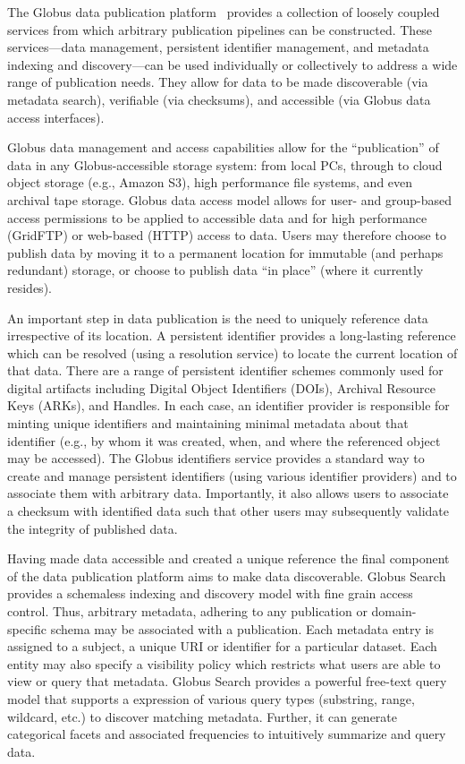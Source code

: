 \documentclass{aip-cp}
\begin{document}
The Globus data publication platform~\cite{chard2015globus} provides a
collection of loosely coupled services from which arbitrary publication
pipelines can be constructed.  These services---data management, persistent
identifier management, and  metadata indexing and discovery---can be used
individually or collectively to address a wide range of publication needs.
They allow for data to be made discoverable (via metadata search), verifiable
(via checksums), and accessible (via Globus data access interfaces).

Globus data management and access capabilities allow for the  ``publication''
of data in any Globus-accessible storage system:  from local PCs, through to
cloud object storage (e.g., Amazon S3), high performance file systems, and
even archival tape storage. Globus data access model allows for user- and
group-based access permissions to be applied to accessible data and for high
performance (GridFTP) or web-based (HTTP) access to data.  Users may therefore
choose to publish data by moving it to a permanent location for  immutable
(and perhaps redundant) storage, or choose to publish  data ``in place''
(where it currently resides).

An important step in data publication is the need to uniquely reference data
irrespective of its location. A persistent identifier provides a long-lasting
reference which can be  resolved (using a resolution service) to locate the
current location of that data. There are a range of persistent identifier
schemes commonly used for digital artifacts including Digital Object
Identifiers (DOIs), Archival Resource Keys (ARKs), and Handles.  In each case,
an identifier provider is responsible for minting unique identifiers and
maintaining minimal metadata about that  identifier (e.g., by whom it was
created, when, and where  the referenced object may be accessed). The Globus
identifiers service provides a standard way to create and manage persistent
identifiers (using various identifier providers) and to associate them with
arbitrary data. Importantly, it also allows users to associate a checksum with
identified data such that other users may subsequently validate the integrity
of published data.

Having made data accessible and created a unique reference the final component
of the data publication platform aims to make data discoverable. Globus Search
provides a schemaless indexing and discovery model with fine grain access
control.  Thus, arbitrary metadata, adhering to any publication or domain-
specific schema may be associated with a publication.  Each metadata entry is
assigned to a subject, a unique  URI or identifier for a particular dataset.
Each entity may also specify a visibility policy which restricts what users
are able to view or query that metadata.  Globus Search provides a powerful
free-text query model that supports a expression of various query types
(substring, range, wildcard, etc.)  to discover matching metadata. Further, it
can generate categorical facets and associated frequencies to  intuitively
summarize and query data.
\end{document}
